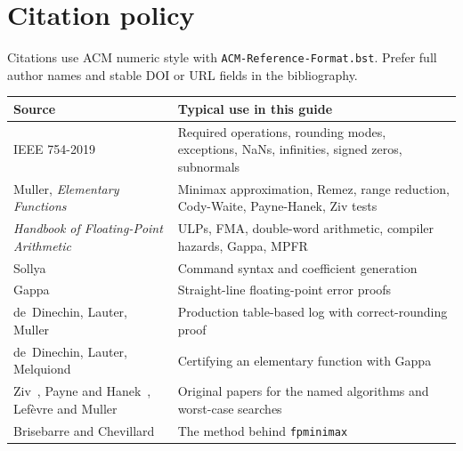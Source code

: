 \documentclass[manuscript, nonacm]{acmart}
\begin{document}


    \section{Citation policy}

    Citations use ACM numeric style with \texttt{ACM-Reference-Format.bst}.
    Prefer full author names and stable DOI or URL fields in the bibliography.

    \begin{table}[tbp]
        \centering
        \begin{tabular}{>{\raggedright\arraybackslash}p{5.3cm}>{\raggedright\arraybackslash}p{6.1cm}}
            \toprule
            Source & Typical use in this guide                                        \\
            \midrule
            IEEE 754-2019~\cite{ieee}
            & Required operations, rounding modes, exceptions, NaNs, infinities,
            signed zeros, subnormals \\
            Muller, \emph{Elementary Functions}~\cite{muller}
            & Minimax approximation, Remez, range reduction, Cody-Waite,
            Payne-Hanek, Ziv tests \\
            \emph{Handbook of Floating-Point Arithmetic}~\cite{handbook}
            & ULPs, FMA, double-word arithmetic, compiler hazards, Gappa, MPFR \\
            Sollya~\cite{sollya}
            & Command syntax and coefficient generation                        \\
            Gappa~\cite{gappa}
            & Straight-line floating-point error proofs                        \\
            de~Dinechin, Lauter, Muller~\cite{dinechinlog}
            & Production table-based log with correct-rounding proof           \\
            de~Dinechin, Lauter, Melquiond~\cite{gappacert}
            & Certifying an elementary function with Gappa                     \\
            Ziv~\cite{ziv1991}, Payne and Hanek~\cite{payne1983},
            Lef\`evre and Muller~\cite{lefevre}
            & Original papers for the named algorithms and worst-case searches \\
            Brisebarre and Chevillard~\cite{brisebarre2007}
            & The method behind \texttt{fpminimax}                             \\

\end{tabular}
\end{table}
\end{document}
